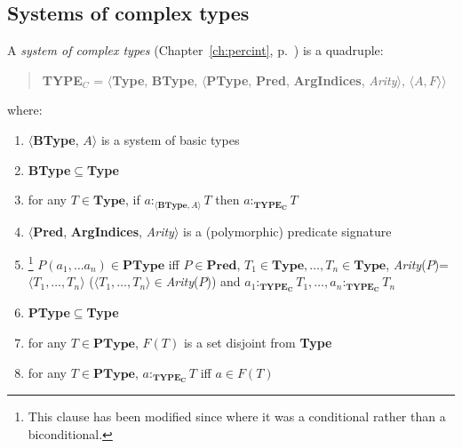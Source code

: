 \subsection{Systems of complex types}
\label{app:comptypes}

A {\it system of complex types\/} (Chapter~\ref{ch:percint},
p.~\pageref{ex:comp-types}) is a quadruple:
\begin{quote}
{\bf TYPE$_C$} = $\langle${\bf Type}, {\bf BType},
$\langle$\textbf{PType}, {\bf Pred}, \textbf{ArgIndices}, {\it Arity\/}$\rangle$, $\langle A,F\rangle$$\rangle$
\end{quote}
where:  
\begin{enumerate} 
 
\item $\langle$\textbf{BType}, $A$$\rangle$ is a system of basic types 
 
\item \textbf{BType}$\subseteq$\textbf{Type}

\item for any $T\in\textbf{Type}$, if $a:_{\langle\mathbf{BType},
    A\rangle}T$ then $a:_{\mathbf{TYPE_C}}T$

\item \label{cl:predtypes}$\langle${\bf Pred}, \textbf{ArgIndices},
  {\it Arity\/}$\rangle$ is a (polymorphic) predicate
  signature

\item\hspace*{-1ex}\footnote{This clause has been modified since
    \cite{Cooper2012} where it was a conditional rather than a biconditional.} %
  $P(a_1,\ldots a_n)\in\textbf{PType}$ iff $P\in\textbf{Pred}$, $T_1\in \mathbf{Type},\ldots,T_n\in
  \mathbf{Type}$, \textit{Arity}($P$)=$\langle
  T_1,\ldots,T_n\rangle$  ($\langle
  T_1,\ldots,T_n\rangle$$\in$\textit{Arity}($P$)) and $a_1:_{\mathbf{TYPE_C}}T_1,\ldots,a_n:_{\mathbf{TYPE_C}}T_n$




\item \textbf{PType}$\subseteq$\textbf{Type}

\item for any $T\in\textbf{PType}$, $F(T)$ is a set disjoint from \textbf{Type}

\item for any $T\in\textbf{PType}$, $a:_{\mathbf{TYPE_C}}T$ iff $a\in F(T)$
 
\end{enumerate}

